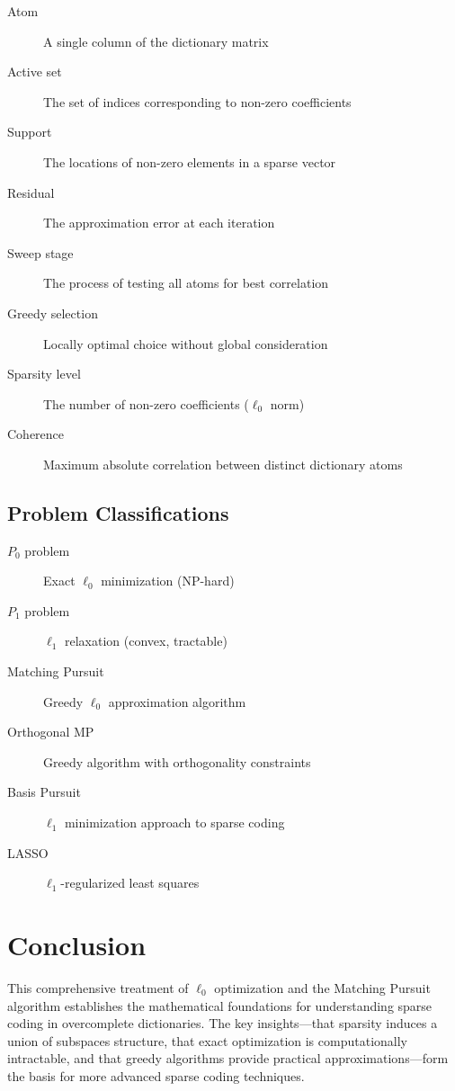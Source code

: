 \documentclass[12pt]{article}
\begin{document}
\begin{description}
    \item[Atom] A single column of the dictionary matrix
    \item[Active set] The set of indices corresponding to non-zero coefficients
    \item[Support] The locations of non-zero elements in a sparse vector
    \item[Residual] The approximation error at each iteration
    \item[Sweep stage] The process of testing all atoms for best correlation
    \item[Greedy selection] Locally optimal choice without global consideration
    \item[Sparsity level] The number of non-zero coefficients ($\ell_0$ norm)
    \item[Coherence] Maximum absolute correlation between distinct dictionary atoms
\end{description}

\subsection{Problem Classifications}

\begin{description}
    \item[$P_0$ problem] Exact $\ell_0$ minimization (NP-hard)
    \item[$P_1$ problem] $\ell_1$ relaxation (convex, tractable)
    \item[Matching Pursuit] Greedy $\ell_0$ approximation algorithm
    \item[Orthogonal MP] Greedy algorithm with orthogonality constraints
    \item[Basis Pursuit] $\ell_1$ minimization approach to sparse coding
    \item[LASSO] $\ell_1$-regularized least squares
\end{description}

\section{Conclusion}

This comprehensive treatment of $\ell_0$ optimization and the Matching Pursuit algorithm establishes the mathematical foundations for understanding sparse coding in overcomplete dictionaries. The key insights—that sparsity induces a union of subspaces structure, that exact optimization is computationally intractable, and that greedy algorithms provide practical approximations—form the basis for more advanced sparse coding techniques.
\end{document}

